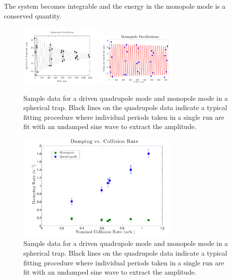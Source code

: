 \documentclass[%
 reprint,
 amsmath,amssymb,
 aps,
]{revtex4-1}
\begin{document}
The system becomes integrable and the energy in the monopole mode is a conserved quantity.



  

\begin{figure}[htb]

    \begin{center}
    \includegraphics[width=40mm]{./figs/725QuadDecay.pdf}
    \includegraphics[width=40mm]{./figs/BreatheDecf56t106Short_v2.pdf}
    \end{center}
    \caption[Cutting up a triangular pyramid]{
        Sample data for a driven quadrupole mode and monopole mode in a spherical trap.
        Black lines on the quadrupole data indicate a typical fitting procedure where individual periods taken in a single run are fit with an undamped sine wave to extract the amplitude.
    }
    \label{pyramid}
\end{figure}


\begin{figure}[htb]

    \begin{center}
    \includegraphics[width=80mm]{./figs/DampingvsCollRateSpherical_v2.pdf}
    \end{center}
    \caption[dampsphere]{
        Sample data for a driven quadrupole mode and monopole mode in a spherical trap.
        Black lines on the quadrupole data indicate a typical fitting procedure where individual periods taken in a single run are fit with an undamped sine wave to extract the amplitude.
    }
    \label{pyramid}
\end{figure}
\end{document}
